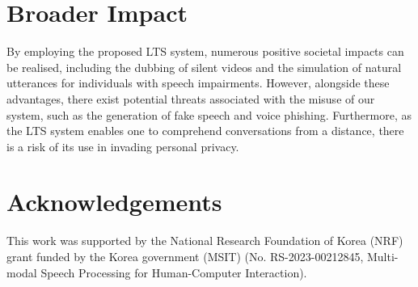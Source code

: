 \documentclass[letterpaper]{article} %
\begin{document}
\section{Broader Impact}
By employing the proposed LTS system, numerous positive societal impacts can be realised, including the dubbing of silent videos and the simulation of natural utterances for individuals with speech impairments.
However, alongside these advantages, there exist potential threats associated with the misuse of our system, such as the generation of fake speech and voice phishing.
Furthermore, as the LTS system enables one to comprehend conversations from a distance, there is a risk of its use in invading personal privacy.

\section{Acknowledgements}
This work was supported by the National Research Foundation of Korea (NRF) grant funded by the Korea government (MSIT) (No. RS-2023-00212845, Multi-modal Speech Processing for Human-Computer Interaction).

% 

\end{document}
